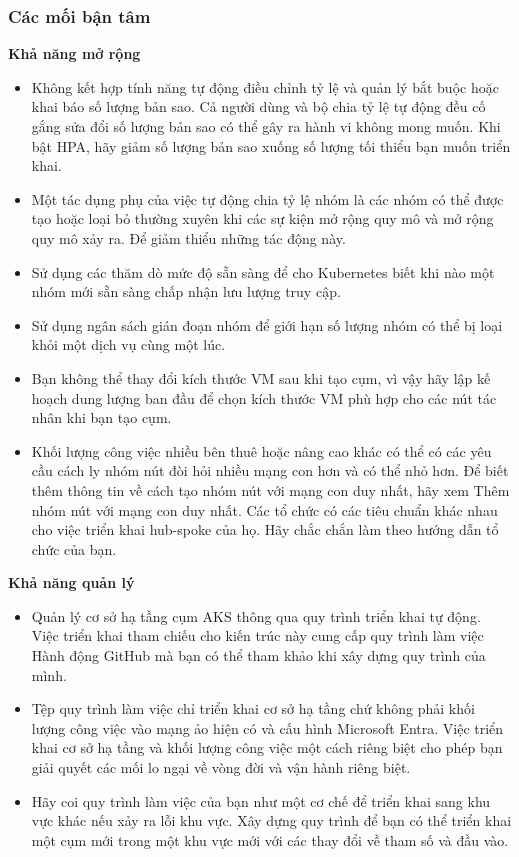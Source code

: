 \subsubsection{Các mối bận tâm}
\noindent \textbf{Khả năng mở rộng}
    \begin{itemize}
        \item Không kết hợp tính năng tự động điều chỉnh tỷ lệ và quản lý bắt buộc hoặc khai báo số lượng bản sao. Cả người dùng và bộ chia tỷ lệ tự động đều cố gắng sửa đổi số lượng bản sao có thể gây ra hành vi không mong muốn. Khi bật HPA, hãy giảm số lượng bản sao xuống số lượng tối thiểu bạn muốn triển khai.
        \item Một tác dụng phụ của việc tự động chia tỷ lệ nhóm là các nhóm có thể được tạo hoặc loại bỏ thường xuyên khi các sự kiện mở rộng quy mô và mở rộng quy mô xảy ra. Để giảm thiểu những tác động này.
        \item Sử dụng các thăm dò mức độ sẵn sàng để cho Kubernetes biết khi nào một nhóm mới sẵn sàng chấp nhận lưu lượng truy cập.
        \item Sử dụng ngân sách gián đoạn nhóm để giới hạn số lượng nhóm có thể bị loại khỏi một dịch vụ cùng một lúc.
        \item Bạn không thể thay đổi kích thước VM sau khi tạo cụm, vì vậy hãy lập kế hoạch dung lượng ban đầu để chọn kích thước VM phù hợp cho các nút tác nhân khi bạn tạo cụm.
        \item Khối lượng công việc nhiều bên thuê hoặc nâng cao khác có thể có các yêu cầu cách ly nhóm nút đòi hỏi nhiều mạng con hơn và có thể nhỏ hơn. Để biết thêm thông tin về cách tạo nhóm nút với mạng con duy nhất, hãy xem Thêm nhóm nút với mạng con duy nhất. Các tổ chức có các tiêu chuẩn khác nhau cho việc triển khai hub-spoke của họ. Hãy chắc chắn làm theo hướng dẫn tổ chức của bạn. 
    \end{itemize}
\textbf{Khả năng quản lý}
    \begin{itemize}
        \item Quản lý cơ sở hạ tầng cụm AKS thông qua quy trình triển khai tự động. Việc triển khai tham chiếu cho kiến trúc này cung cấp quy trình làm việc Hành động GitHub mà bạn có thể tham khảo khi xây dựng quy trình của mình.
        \item Tệp quy trình làm việc chỉ triển khai cơ sở hạ tầng chứ không phải khối lượng công việc vào mạng ảo hiện có và cấu hình Microsoft Entra. Việc triển khai cơ sở hạ tầng và khối lượng công việc một cách riêng biệt cho phép bạn giải quyết các mối lo ngại về vòng đời và vận hành riêng biệt.
        \item Hãy coi quy trình làm việc của bạn như một cơ chế để triển khai sang khu vực khác nếu xảy ra lỗi khu vực. Xây dựng quy trình để bạn có thể triển khai một cụm mới trong một khu vực mới với các thay đổi về tham số và đầu vào. 
    \end{itemize}
